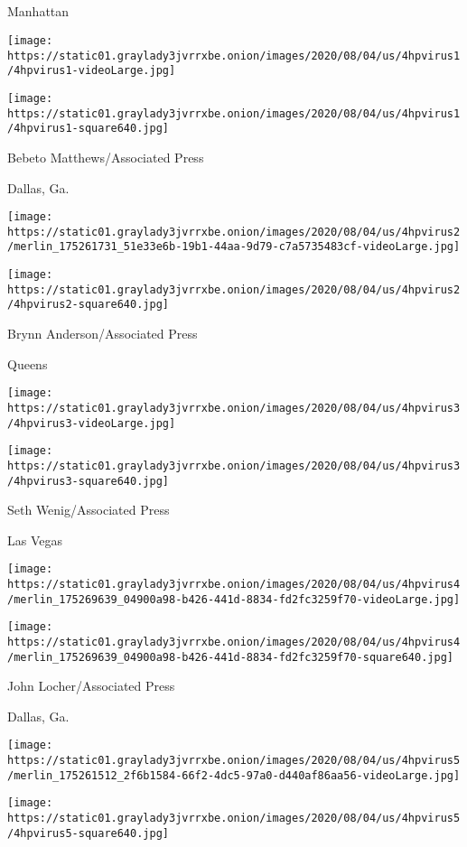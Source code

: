 \subsection{}

\href{https://www.nytimes3xbfgragh.onion/2020/08/04/world/coronavirus-covid-19.html}{}

Manhattan

\texttt{[image: https://static01.graylady3jvrrxbe.onion/images/2020/08/04/us/4hpvirus1/4hpvirus1-videoLarge.jpg]}

\texttt{[image: https://static01.graylady3jvrrxbe.onion/images/2020/08/04/us/4hpvirus1/4hpvirus1-square640.jpg]}

 Bebeto Matthews/Associated Press

Dallas, Ga.

\texttt{[image: https://static01.graylady3jvrrxbe.onion/images/2020/08/04/us/4hpvirus2/merlin\_175261731\_51e33e6b-19b1-44aa-9d79-c7a5735483cf-videoLarge.jpg]}

\texttt{[image: https://static01.graylady3jvrrxbe.onion/images/2020/08/04/us/4hpvirus2/4hpvirus2-square640.jpg]}

 Brynn Anderson/Associated Press

Queens

\texttt{[image: https://static01.graylady3jvrrxbe.onion/images/2020/08/04/us/4hpvirus3/4hpvirus3-videoLarge.jpg]}

\texttt{[image: https://static01.graylady3jvrrxbe.onion/images/2020/08/04/us/4hpvirus3/4hpvirus3-square640.jpg]}

 Seth Wenig/Associated Press

Las Vegas

\texttt{[image: https://static01.graylady3jvrrxbe.onion/images/2020/08/04/us/4hpvirus4/merlin\_175269639\_04900a98-b426-441d-8834-fd2fc3259f70-videoLarge.jpg]}

\texttt{[image: https://static01.graylady3jvrrxbe.onion/images/2020/08/04/us/4hpvirus4/merlin\_175269639\_04900a98-b426-441d-8834-fd2fc3259f70-square640.jpg]}

 John Locher/Associated Press

Dallas, Ga.

\texttt{[image: https://static01.graylady3jvrrxbe.onion/images/2020/08/04/us/4hpvirus5/merlin\_175261512\_2f6b1584-66f2-4dc5-97a0-d440af86aa56-videoLarge.jpg]}

\texttt{[image: https://static01.graylady3jvrrxbe.onion/images/2020/08/04/us/4hpvirus5/4hpvirus5-square640.jpg]}

